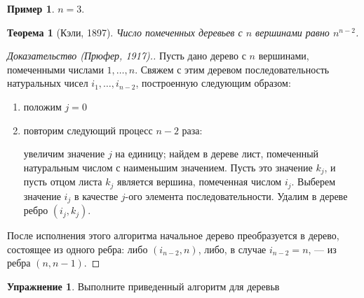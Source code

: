 \documentclass[12pt,a4paper]{article}
\theoremstyle{plain}
\newtheorem{theorem}{Теорема}
\theoremstyle{definition}
\newtheorem*{task}{Упражнение}
\newtheorem*{example}{Пример}
\theoremstyle{remark}
\begin{document}
\begin{example}
$n=3$.

\end{example}

\begin{theorem}[Кэли, 1897]
Число помеченных деревьев с $n$ вершинами равно $n^{n-2}$.
\end{theorem}

\begin{proof}[Доказательство (Прюфер, 1917).]
Пусть дано дерево с $n$ вершинами, помеченными числами $1,\ldots,n$. Свяжем с этим деревом последовательность натуральных чисел $i_1,\ldots,i_{n-2}$, построенную следующим образом:
\begin{enumerate}
\item положим $j=0$
\item повторим следующий процесс $n-2$ раза:

увеличим значение $j$ на единицу; найдем в дереве лист, помеченный натуральным числом с наименьшим значением. Пусть это значение $k_j$, и пусть отцом листа $k_j$ является вершина, помеченная числом $i_j$. Выберем значение $i_j$ в качестве $j$-ого элемента последовательности. Удалим в дереве ребро $(i_j,k_j)$.
\end{enumerate}

После исполнения этого алгоритма начальное дерево преобразуется в дерево, состоящее из одного ребра: либо $(i_{n-2},n)$, либо, в случае $i_{n-2}=n$, --- из ребра $(n,n-1)$.
\end{proof}

\begin{task}
Выполните приведенный алгоритм для деревьв

\end{task}
\end{document}
